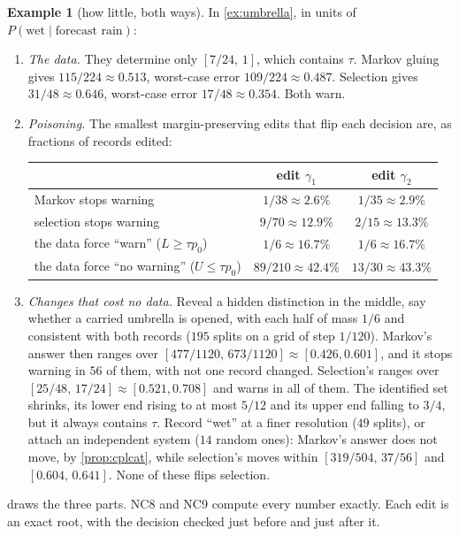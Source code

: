 \documentclass[11pt]{article}
\theoremstyle{definition}\newtheorem{definition}[theorem]{Definition}\newtheorem{remark}[theorem]{Remark}\newtheorem{example}[theorem]{Example}\newtheorem{problem}[theorem]{Open problem}\crefname{problem}{Problem}{Problems}
\begin{document}
\begin{example}[how little, both ways]\label{ex:howlittle}
In \cref{ex:umbrella}, in units of $P(\text{wet}\mid\text{forecast rain})$:
\begin{enumerate}
\item[(1)] \emph{The data.} They determine only $[7/24,\,1]$, which contains $\tau$. Markov gluing gives $115/224\approx0.513$, worst-case error $109/224\approx0.487$. Selection gives $31/48\approx0.646$, worst-case error
$17/48\approx0.354$. Both warn.
\item[(2)] \emph{Poisoning.} The smallest margin-preserving edits that flip each decision are, as fractions of records edited:
\begin{center}\small
\begin{tabular}{lcc}\toprule
& edit $\gamma_1$ & edit $\gamma_2$\\\midrule
Markov stops warning & $1/38\approx2.6\%$ & $1/35\approx2.9\%$\\
selection stops warning & $9/70\approx12.9\%$ & $2/15\approx13.3\%$\\
the data force ``warn'' ($L\ge\tau p_0$) & $1/6\approx16.7\%$ & $1/6\approx16.7\%$\\
the data force ``no warning'' ($U\le\tau p_0$) & $89/210\approx42.4\%$ & $13/30\approx43.3\%$\\\bottomrule
\end{tabular}
\end{center}
\item[(3)] \emph{Changes that cost no data.} Reveal a hidden distinction in the middle, say whether a carried umbrella is opened, with each half of mass $1/6$ and consistent with both records ($195$ splits on a grid
of step $1/120$). Markov's answer then ranges over $[477/1120,\,673/1120]\approx[0.426,0.601]$, and it stops warning in $56$ of them, with not one record changed. Selection's ranges over
$[25/48,\,17/24]\approx[0.521,0.708]$ and warns in all of them. The identified set shrinks, its lower end rising to at most $5/12$ and its upper end falling to $3/4$, but it always contains $\tau$. Record
``wet'' at a finer resolution ($49$ splits), or attach an independent system ($14$ random ones): Markov's answer does not move, by \cref{prop:cplcat}, while selection's moves within $[319/504,\,37/56]$ and $[0.604,\,0.641]$.
None of these flips selection.
\end{enumerate}
 draws the three parts. NC8 and NC9 compute every number exactly. Each edit is an exact root, with the decision checked just before and just after it.
\end{example}
\end{document}

